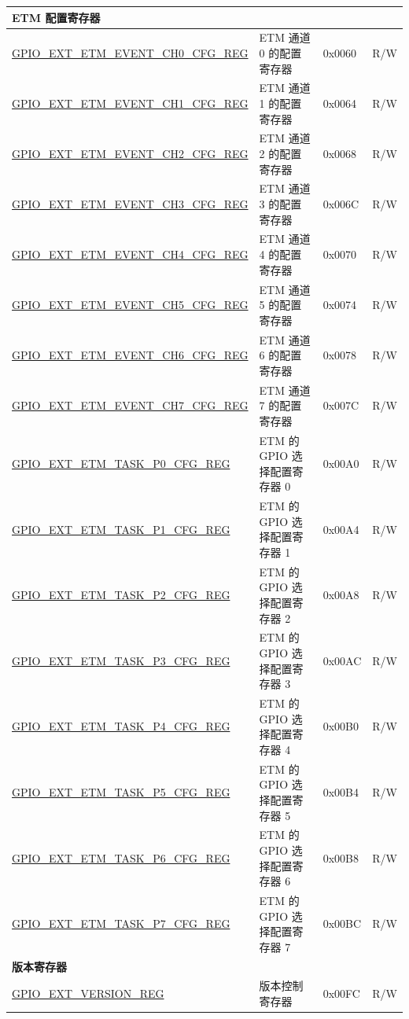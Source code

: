 \begin{longtable}{ | p{6.2cm} | p{7.0cm} | p{1.3cm} | p{1cm} | }
\multicolumn{4}{|l|}{\textbf{ETM 配置寄存器}} \\ \hline
\hyperref[regdesc:GPIOSDETMEVENTCHNCFGREG]{GPIO\_EXT\_ETM\_EVENT\_CH0\_CFG\_REG} & ETM 通道 0 的配置寄存器 & 0x0060 & R/W \\ \hline
\hyperref[regdesc:GPIOSDETMEVENTCHNCFGREG]{GPIO\_EXT\_ETM\_EVENT\_CH1\_CFG\_REG} & ETM 通道 1 的配置寄存器 & 0x0064 & R/W \\ \hline
\hyperref[regdesc:GPIOSDETMEVENTCHNCFGREG]{GPIO\_EXT\_ETM\_EVENT\_CH2\_CFG\_REG} & ETM 通道 2 的配置寄存器 & 0x0068 & R/W \\ \hline
\hyperref[regdesc:GPIOSDETMEVENTCHNCFGREG]{GPIO\_EXT\_ETM\_EVENT\_CH3\_CFG\_REG} & ETM 通道 3 的配置寄存器 & 0x006C & R/W \\ \hline
\hyperref[regdesc:GPIOSDETMEVENTCHNCFGREG]{GPIO\_EXT\_ETM\_EVENT\_CH4\_CFG\_REG} & ETM 通道 4 的配置寄存器 & 0x0070 & R/W \\ \hline
\hyperref[regdesc:GPIOSDETMEVENTCHNCFGREG]{GPIO\_EXT\_ETM\_EVENT\_CH5\_CFG\_REG} & ETM 通道 5 的配置寄存器 & 0x0074 & R/W \\ \hline
\hyperref[regdesc:GPIOSDETMEVENTCHNCFGREG]{GPIO\_EXT\_ETM\_EVENT\_CH6\_CFG\_REG} & ETM 通道 6 的配置寄存器 & 0x0078 & R/W \\ \hline
\hyperref[regdesc:GPIOSDETMEVENTCHNCFGREG]{GPIO\_EXT\_ETM\_EVENT\_CH7\_CFG\_REG} & ETM 通道 7 的配置寄存器 & 0x007C & R/W \\ \hline
\hyperref[regdesc:GPIOSDETMTASKP0CFGREG]{GPIO\_EXT\_ETM\_TASK\_P0\_CFG\_REG} & ETM 的 GPIO 选择配置寄存器 0& 0x00A0 & R/W \\ \hline
\hyperref[regdesc:GPIOSDETMTASKP1CFGREG]{GPIO\_EXT\_ETM\_TASK\_P1\_CFG\_REG} &  ETM 的 GPIO 选择配置寄存器 1 & 0x00A4 & R/W \\ \hline
\hyperref[regdesc:GPIOSDETMTASKP2CFGREG]{GPIO\_EXT\_ETM\_TASK\_P2\_CFG\_REG} &  ETM 的 GPIO 选择配置寄存器 2 & 0x00A8 & R/W \\ \hline
\hyperref[regdesc:GPIOSDETMTASKP3CFGREG]{GPIO\_EXT\_ETM\_TASK\_P3\_CFG\_REG} &  ETM 的 GPIO 选择配置寄存器 3 & 0x00AC & R/W \\ \hline
\hyperref[regdesc:GPIOSDETMTASKP4CFGREG]{GPIO\_EXT\_ETM\_TASK\_P4\_CFG\_REG} &  ETM 的 GPIO 选择配置寄存器 4 & 0x00B0 & R/W \\ \hline
\hyperref[regdesc:GPIOSDETMTASKP5CFGREG]{GPIO\_EXT\_ETM\_TASK\_P5\_CFG\_REG} &  ETM 的 GPIO 选择配置寄存器 5 & 0x00B4 & R/W \\ \hline
\hyperref[regdesc:GPIOSDETMTASKP6CFGREG]{GPIO\_EXT\_ETM\_TASK\_P6\_CFG\_REG} &  ETM 的 GPIO 选择配置寄存器 6 & 0x00B8 & R/W \\ \hline
\hyperref[regdesc:GPIOSDETMTASKP7CFGREG]{GPIO\_EXT\_ETM\_TASK\_P7\_CFG\_REG} &  ETM 的 GPIO 选择配置寄存器 7 & 0x00BC & R/W \\ \hline
\multicolumn{4}{|l|}{\textbf{版本寄存器}} \\ \hline
\hyperref[regdesc:GPIOSDVERSIONREG]{GPIO\_EXT\_VERSION\_REG} & 版本控制寄存器 & 0x00FC & R/W \\ \hline
\end{longtable}
